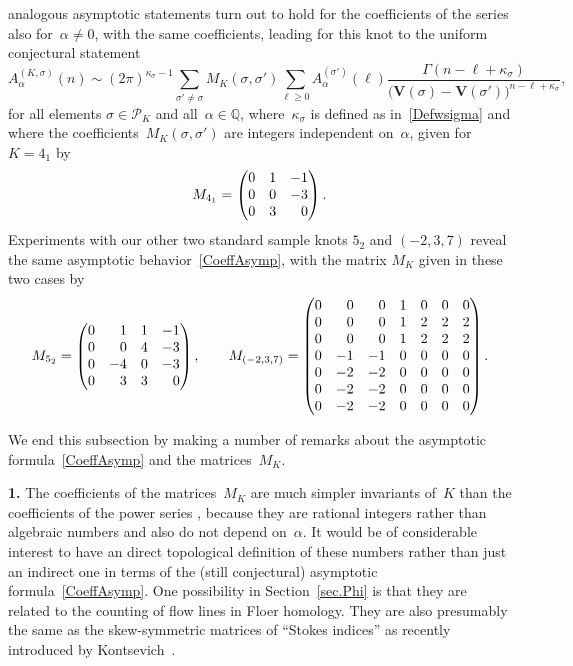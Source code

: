 \documentclass[pdftex]{sigma}
\numberwithin{equation}{section}
\def\calP{\mathcal P}
\def\calP{\mathcal P}
\def\l{\lambda}
\def\a{\alpha}
\def\l{\lambda}
\def\Q{\mathbb Q}
\def\a{\alpha}
\def\l{\lambda}
\def\G{\Gamma}
\def\s{\sigma}
\def\W{\kappa} %
\def\G{\Gamma}
\def\V{\mathbf V}
\def\be{\begin{equation}}
\def\ee{\end{equation}}
\begin{document}
analogous asymptotic statements turn out to hold for the coefficients of the
series \smash{$\Phi^{(4_1,\s)}_\a$} also for~$\a\ne0$, with the same coefficients,
leading for this knot to the uniform conjectural statement
\be
\label{CoeffAsymp}
A_\a^{(K,\s)}(n) \sim (2\pi)^{\W_\s-1} %
\sum_{\s'\ne\s}M_K(\s,\s') \sum_{\ell\ge0} A^{(\s')}_\a(\ell)
\frac{\G(n-\ell+\W_\s)}{\bigl(\V(\s)-\V(\s')\bigr)^{n-\ell+\W_\s}} ,
\ee
for all elements $\s\in\calP_K$ and all~$\a\in\Q$, where~$\W_\s$ is defined
as in~\eqref{Defwsigma} and where the coefficients~$M_K(\s,\s')$ are integers
independent on~$\a$, given for $K=4_1$ by
\[%
M_{4_1} =
\begin{pmatrix} 0 & 1 & -1 \\ 0 & 0 & -3 \\ 0 & 3 & \hphantom{-}0 \end{pmatrix} .
\]
Experiments with our other two standard sample knots $5_2$ and $(-2,3,7)$
reveal the same asymptotic behavior~\eqref{CoeffAsymp}, with the matrix
$M_K$ given in these two cases by
\[%
M_{5_2} = \begin{pmatrix}
 0 & \hphantom{-}1 & 1 & -1 \\
 0 & \hphantom{-}0 & 4 & -3 \\
 0 & -4 & 0 & -3 \\
 0 & \hphantom{-}3 & 3 & \hphantom{-}0 \end{pmatrix} ,
\qquad
M_{(-2,3,7)} =
\begin{pmatrix} 0 & \hphantom{-}0 & \hphantom{-}0 & 1 & 0 & 0 & 0 \\
 0 & \hphantom{-}0 & \hphantom{-}0 & 1 & 2 & 2 & 2 \\
 0 & \hphantom{-}0 & \hphantom{-}0 & 1 & 2 & 2 & 2 \\
 0 & -1 & -1 & 0 & 0 & 0 & 0 \\
 0 & -2 & -2 & 0 & 0 & 0 & 0 \\
 0 & -2 & -2 & 0 & 0 & 0 & 0 \\
 0 & -2 & -2 & 0 & 0 & 0 & 0 \end{pmatrix} .
\]

We end this subsection by making a number of remarks about the asymptotic
formula~\eqref{CoeffAsymp} and the matrices~$M_K$.

{\bf 1.}
The coefficients of the matrices~$M_K$ are much simpler invariants of~$K$ than
the coefficients of the power series \smash{$\Phi^{(\s)}_\a$}, because they are rational
integers rather than algebraic numbers and also do not depend on~$\a$.
It would be of considerable interest to have an direct topological definition
of these numbers rather than just an indirect one in terms of the (still
conjectural) asymptotic formula~\eqref{CoeffAsymp}. One possibility
in Section~\ref{sec.Phi} is that
they are related to the counting of flow lines in Floer homology. They are also
presumably the same as the skew-symmetric matrices of ``Stokes indices'' as
recently introduced by Kontsevich~\cite{MaximTalks}.
\end{document}
